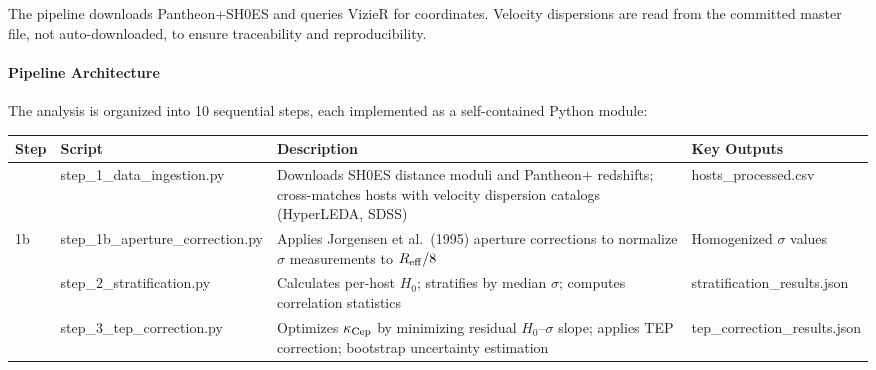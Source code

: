 \documentclass[
]{article}
\newcounter{none} %
\begin{document}
The pipeline downloads Pantheon+SH0ES and queries VizieR for
coordinates. Velocity dispersions are read from the committed master
file, not auto-downloaded, to ensure traceability and reproducibility.

\paragraph{Pipeline Architecture}\label{pipeline-architecture}

The analysis is organized into 10 sequential steps, each implemented as
a self-contained Python module:

{\def\LTcaptype{none} %
\begin{longtable}[]{@{}
  >{\raggedright\arraybackslash}p{}
  >{\raggedright\arraybackslash}p{}
  >{\raggedright\arraybackslash}p{}
  >{\raggedright\arraybackslash}p{}@{}}
\toprule\noalign{}
\begin{minipage}[b]{\linewidth}\raggedright
Step
\end{minipage} & \begin{minipage}[b]{\linewidth}\raggedright
Script
\end{minipage} & \begin{minipage}[b]{\linewidth}\raggedright
Description
\end{minipage} & \begin{minipage}[b]{\linewidth}\raggedright
Key Outputs
\end{minipage} \\
\midrule\noalign{}
\endhead
\bottomrule\noalign{}
\endlastfoot
1 & step\_1\_data\_ingestion.py & Downloads SH0ES distance moduli and
Pantheon+ redshifts; cross-matches hosts with velocity dispersion
catalogs (HyperLEDA, SDSS) & hosts\_processed.csv \\
1b & step\_1b\_aperture\_correction.py & Applies Jorgensen et al.~(1995)
aperture corrections to normalize \(\sigma\) measurements to
\(R_{\rm eff}/8\) & Homogenized \(\sigma\) values \\
2 & step\_2\_stratification.py & Calculates per-host \(H_0\); stratifies
by median \(\sigma\); computes correlation statistics &
stratification\_results.json \\
3 & step\_3\_tep\_correction.py & Optimizes \(\kappa_{\rm Cep}\) by
minimizing residual \(H_0\)--\(\sigma\) slope; applies TEP correction;
bootstrap uncertainty estimation & tep\_correction\_results.json \\

\end{longtable}}
\end{document}
